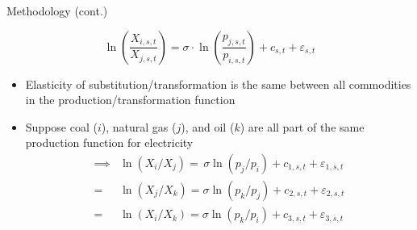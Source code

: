 \documentclass[11pt,aspectratio=169]{beamer}
\begin{document}
\begin{frame}{Methodology (cont.)}


\vspace{0.5em}

\begin{block}{}
	$$\ln\left(\frac{X_{i,s,t}}{X_{j,s,t}}\right) = \sigma \cdot \ln\left(\frac{ p_{j,s,t}}{ p_{i,s,t}}\right) + c_{s,t} + \varepsilon_{s,t}$$
\end{block}

\vspace{-0em}

\begin{itemize}
	
	
	\item Elasticity of substitution/transformation is the same between all commodities in the production/transformation function 
	
	\item Suppose coal ($i$), natural gas ($j$), and oil ($k$) are all part of the same production function for electricity
	\begin{align*}
	\implies &\ln(X_i/X_j) = \, \sigma \ln(p_j / p_i) + c_{1,s,t} + \varepsilon_{1,s,t} \\
	= &\ln(X_j/X_k) = \sigma \ln(p_k / p_j) + c_{2,s,t} + \varepsilon_{2,s,t} \\
	= &\ln(X_i/X_k) = \sigma \ln(p_k / p_i) + c_{3,s,t} + \varepsilon_{3,s,t}
	\end{align*}
	
\end{itemize}

\end{frame}
\end{document}
